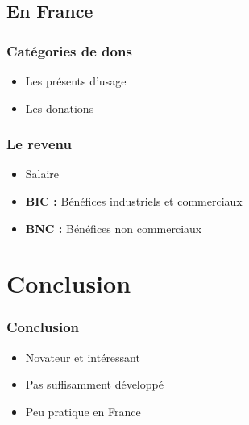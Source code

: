     \subsection{En France}


\begin{frame}
\frametitle{Catégories de dons}

\begin{itemize}
    \itemsep1.5em
    \item Les présents d'usage
    \item Les donations
\end{itemize}
\end{frame}


\begin{frame}
\frametitle{Le revenu}

\begin{itemize}
    \itemsep1.5em
    \item Salaire
    \item \textbf{BIC :} Bénéfices industriels et commerciaux
    \item \textbf{BNC :} Bénéfices non commerciaux
\end{itemize}
\end{frame}


    \section{Conclusion}


\begin{frame}
\frametitle{Conclusion}
\begin{itemize}
    \itemsep1.5em
    \item Novateur et intéressant
    \item Pas suffisamment développé
    \item Peu pratique en France
\end{itemize}
\end{frame}
